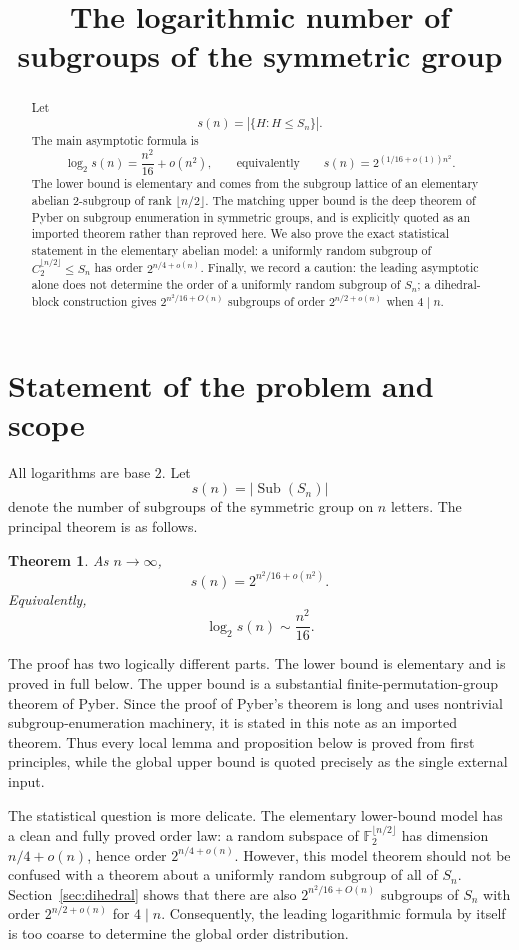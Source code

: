 \documentclass[a4paper,11pt]{amsart}
\title[Subgroups of the symmetric group]{The logarithmic number of subgroups of the symmetric group}
\author{}
\date{}
\newtheorem{theorem}{Theorem}[section]
\theoremstyle{remark}
\newcommand{\Sub}{\operatorname{Sub}}
\newcommand{\F}{\mathbb F}
\begin{document}
\begin{abstract}
Let
\[
        s(n)=|\{H:H\leq S_n\}|.
\]
The main asymptotic formula is
\[
        \log_2 s(n)=\frac{n^2}{16}+o(n^2),
        \qquad\text{equivalently}\qquad
        s(n)=2^{(1/16+o(1))n^2}.
\]
The lower bound is elementary and comes from the subgroup lattice of an elementary abelian
2-subgroup of rank \(\lfloor n/2\rfloor\). The matching upper bound is the deep theorem of
Pyber on subgroup enumeration in symmetric groups, and is explicitly quoted as an imported
theorem rather than reproved here. We also prove the exact statistical statement in the elementary
abelian model: a uniformly random subgroup of \(C_2^{\lfloor n/2\rfloor}\leq S_n\) has order
\(2^{n/4+o(n)}\). Finally, we record a caution: the leading asymptotic alone does not determine
the order of a uniformly random subgroup of \(S_n\); a dihedral-block construction gives
\(2^{n^2/16+O(n)}\) subgroups of order \(2^{n/2+o(n)}\) when \(4\mid n\).
\end{abstract}

\maketitle

\section{Statement of the problem and scope}

All logarithms are base \(2\). Let
\[
        s(n)=|\Sub(S_n)|
\]
denote the number of subgroups of the symmetric group on \(n\) letters. The principal theorem is
as follows.

\begin{theorem}\label{thm:main}
As \(n\to\infty\),
\[
        s(n)=2^{n^2/16+o(n^2)}.
\]
Equivalently,
\[
        \log_2 s(n)\sim \frac{n^2}{16}.
\]
\end{theorem}

The proof has two logically different parts. The lower bound is elementary and is proved in full
below. The upper bound is a substantial finite-permutation-group theorem of Pyber. Since the
proof of Pyber's theorem is long and uses nontrivial subgroup-enumeration machinery, it is stated
in this note as an imported theorem. Thus every local lemma and proposition below is proved from
first principles, while the global upper bound is quoted precisely as the single external input.

The statistical question is more delicate. The elementary lower-bound model has a clean and fully
proved order law: a random subspace of \(\F_2^{\lfloor n/2\rfloor}\) has dimension
\(n/4+o(n)\), hence order \(2^{n/4+o(n)}\). However, this model theorem should not be confused
with a theorem about a uniformly random subgroup of all of \(S_n\). Section~\ref{sec:dihedral}
shows that there are also \(2^{n^2/16+O(n)}\) subgroups of \(S_n\) with order
\(2^{n/2+o(n)}\) for \(4\mid n\). Consequently, the leading logarithmic formula by itself is too
coarse to determine the global order distribution.
\end{document}
